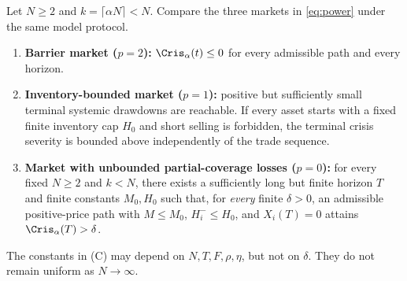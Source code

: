 \documentclass[review,hidelinks,onefignum,onetabnum]{siamonline250211}
\begin{document}
\begin{theorem}\label{thm:ABC}
Let $N\ge2$ and $k=\lceil\alpha N\rceil<N$. Compare the three markets in \eqref{eq:power} under the same model protocol.
\begin{enumerate}[label=\textup{(\Alph*)},leftmargin=2em,itemsep=0.15em]
\item \textbf{Barrier market ($p=2$):} $\Cris_\alpha(t)\le0$ for every admissible path and every horizon.
\item \textbf{Inventory-bounded market ($p=1$):} positive but sufficiently small terminal systemic drawdowns are reachable. If every asset starts with a fixed finite inventory cap $H_0$ and short selling is forbidden, the terminal crisis severity is bounded above independently of the trade sequence.
\item \textbf{Market with unbounded partial-coverage losses ($p=0$):} for every fixed $N\ge2$ and $k<N$, there exists a sufficiently long but finite horizon $T$ and finite constants $M_0,H_0$ such that, for \emph{every} finite $\delta>0$, an admissible positive-price path with $M\le M_0$, $H_i^-\le H_0$, and $X_i(T)=0$ attains $\Cris_\alpha(T)>\delta$.
\end{enumerate}
The constants in (C) may depend on $N,T,F,\rho,\eta$, but not on $\delta$. They do not remain uniform as $N\to\infty$.
\end{theorem}
\end{document}
